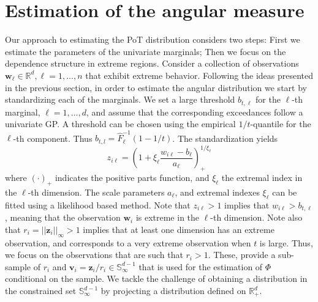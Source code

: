\section{Estimation of the angular measure\label{sec:methodology}}

Our approach to estimating the PoT distribution considers two 
steps: First we estimate the parameters of the univariate 
marginals; Then we focus on the dependence structure in extreme
regions.
Consider a collection of observations $\bm{w}_\ell \in {\mathbb R}^d,
\ell = 1, \ldots, n$ that exhibit extreme behavior. Following the 
ideas presented in the previous section, in order to estimate the
angular distribution we start by standardizing each
of the marginals. We set a large threshold $b_{t,\ell}$ for the 
$\ell$-th marginal, $\ell = 1, \ldots,d$, and assume that the 
corresponding exceedances follow a univariate GP. A threshold can 
be chosen using the empirical $1/t$-quantile for the $\ell$-th 
component. Thus $b_{t,l} = \hat{F}^{-1}_{\ell}(1 - 1/t)$. The  
standardization  yields
\begin{equation}
        \label{eqn:standardization}
        z_{i\ell} = \left(1 + \xi_{\ell}\frac{w_{i\ell} -
            b_{\ell}}{a_{\ell}}\right)_{+}^{1/\xi_{\ell}}
    \end{equation}
where $(\cdot)_+$ indicates the positive parts function, and 
$\xi_{\ell}$ the extremal index in the $\ell$-th dimension. The scale parameters $a_\ell$, and extremal indexes $\xi_\ell$ can be fitted using a likelihood based method. Note that  $z_{i\ell}> 1$
implies that $w_{i\ell} > b_{t,\ell}$, meaning that the 
observation $\bm{w}_i$ is extreme in the $\ell$-th dimension. 
Note also that $r_i = ||\bm{z}_i||_\infty > 1$ implies that at
least one dimension has an extreme observation, and corresponds 
to a very extreme observation when $t$ is large. Thus, we focus on 
the observations that are such that $r_i > 1$. These, provide a
sub-sample of $r_i$ and $\bm{v}_i = \bm{z}_i /r_i \in 
\mathbb{S}_{\infty}^{d-1}$ that is used for  the estimation of 
$\Phi$ conditional on the sample. We tackle the challenge
of obtaining a distribution in the constrained set  
$\mathbb{S}_{\infty}^{d-1}$ by projecting a distribution defined on
$\mathbb{R}^d_+$.

